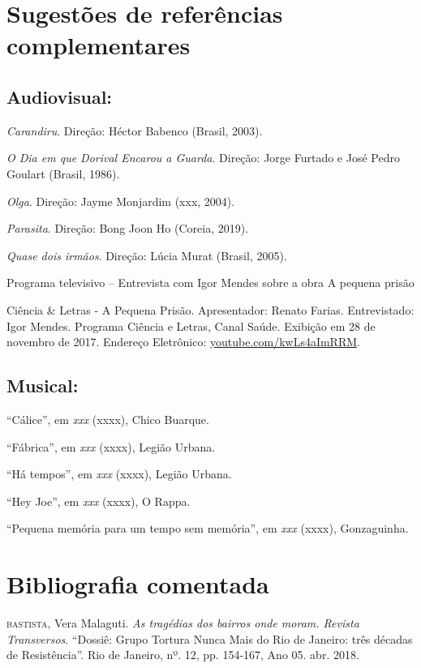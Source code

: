 \documentclass[11pt]{extarticle}
\begin{document}
\section{Sugestões de referências complementares}

\subsection{Audiovisual:}

\textit{Carandiru}. Direção: Héctor Babenco (Brasil, 2003).

\textit{O Dia em que Dorival Encarou a Guarda}. Direção: Jorge Furtado e José Pedro Goulart (Brasil, 1986).

\textit{Olga}. Direção: Jayme Monjardim (xxx, 2004).

\textit{Parasita}. Direção: Bong Joon Ho (Coreia, 2019).

\textit{Quase dois irmãos}. Direção: Lúcia Murat (Brasil, 2005).

{{Programa televisivo} -- Entrevista com Igor Mendes sobre a obra
A pequena prisão}

Ciência \& Letras - A Pequena Prisão. Apresentador: Renato Farias. Entrevistado: Igor Mendes. Programa Ciência e Letras, Canal Saúde. 
Exibição em 28 de novembro de 2017. Endereço Eletrônico: \href{youtube.com/kwLs4aImRRM}{{youtube.com/kwLs4aImRRM}}.

\subsection{Musical:}

``Cálice'', em \emph{xxx} (xxxx), Chico Buarque.

``Fábrica'', em \emph{xxx} (xxxx), Legião Urbana.

``Há tempos'', em \emph{xxx} (xxxx), Legião Urbana.

``Hey Joe'', em \emph{xxx} (xxxx), O Rappa.

``Pequena memória para um tempo sem memória'', em \emph{xxx} (xxxx), Gonzaguinha.

\section{Bibliografia comentada}

\textsc{bastista}, Vera Malaguti. \textit{As tragédias dos bairros onde moram. 
Revista Transversos}. ``Dossiê: Grupo Tortura Nunca Mais do Rio de Janeiro: 
três décadas de Resistência''. Rio de Janeiro, nº. 12, pp. 154-167, Ano 05. abr. 2018.
\end{document}
